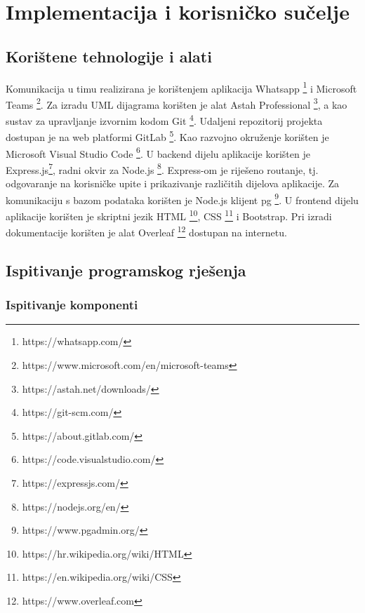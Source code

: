 \chapter{Implementacija i korisničko sučelje}
		\begin{flushleft}
		\section{Korištene tehnologije i alati}

			Komunikacija u timu realizirana je korištenjem aplikacija Whatsapp \footnote{https://whatsapp.com/} i Microsoft Teams \footnote{https://www.microsoft.com/en/microsoft-teams}. Za izradu UML dijagrama korišten je alat Astah Professional \footnote{https://astah.net/downloads/}, a kao sustav za upravljanje izvornim kodom Git \footnote{https://git-scm.com/}. Udaljeni repozitorij projekta dostupan je na web platformi GitLab \footnote{https://about.gitlab.com/}. 
		    Kao razvojno okruženje korišten je Microsoft Visual Studio Code \footnote{https://code.visualstudio.com/}. U backend dijelu aplikacije korišten je Express.js\footnote{https://expressjs.com/}, radni okvir za Node.js \footnote{https://nodejs.org/en/}. Express-om je riješeno {routanje}, tj. odgovaranje na korisničke upite i prikazivanje različitih dijelova aplikacije. 
            Za komunikaciju s bazom podataka korišten je Node.js klijent pg \footnote{https://www.pgadmin.org/}. U frontend dijelu aplikacije korišten je skriptni jezik HTML \footnote{https://hr.wikipedia.org/wiki/HTML}, CSS \footnote{https://en.wikipedia.org/wiki/CSS} i Bootstrap. Pri izradi dokumentacije korišten je alat Overleaf \footnote{https://www.overleaf.com} dostupan na internetu.
			
			\eject 
		
	
		\section{Ispitivanje programskog rješenja}
	
			\subsection{Ispitivanje komponenti}
			

\end{flushleft}

